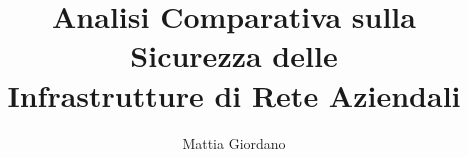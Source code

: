 \documentclass[italian, noexaminfo, oneside]{sapthesis}
\title{Analisi Comparativa sulla Sicurezza delle \\Infrastrutture di Rete Aziendali}
\author{Mattia Giordano}
\begin{document}
\frontmatter

\maketitle

\dedication{«Non possiamo dirigere il vento ma possiamo orientare le vele.»\\Seneca.}


{} %


\cleardoublepage
\tableofcontents
\let\cleardoublepage\clearpage

\cleardoublepage
\mainmatter












\backmatter
{}



\nocite{*}

\backmatter

\end{document}
